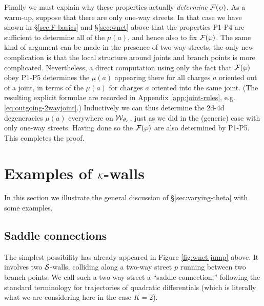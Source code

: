 \documentclass[11pt,a4paper]{article}
\def\CK {{\cal K}}
\def\CF {{\cal F}}
\def\wnet {{\cal W}}
\def\cS {{\cal S}}
\def\CK{{\cal K}}
\newcommand{\ti}[1]{\textit{#1}}
\def\CK {{\cal K}}
\def\CF {{\cal F}}
\def\wnet {{\cal W}}
\def\CK{{\cal K}}
\begin{document}
Finally we must explain why these properties actually \ti{determine} $\CF(\wp)$.
As a warm-up, suppose that there are only one-way streets.  In that case we have shown in \S \ref{sec:F-basics}
and \S \ref{sec:wnet} above that the properties P1-P4 are sufficient to determine all of the $\mu(a)$,
and hence also to fix $\CF(\wp)$.
The same kind of argument can be made in the presence of two-way streets; the only new complication is that
the local structure around joints and branch points is more complicated.
Nevertheless, a direct computation
using only the fact that $\CF(\wp)$ obey P1-P5 determines the $\mu(a)$ appearing there
for all charges $a$ oriented out of a joint, in terms of the $\mu(a)$ for charges $a$
oriented into the same joint.
(The resulting explicit formulae are recorded in Appendix
\ref{app:joint-rules}, e.g. \eqref{eq:outgoing-2wayjoint}.)
Inductively we can thus determine the 2d-4d
degeneracies $\mu(a)$ everywhere on $\wnet_{\vartheta_c}$, just as we did in the (generic) case
with only one-way streets.
Having done so the $\CF(\wp)$ are also determined by P1-P5.  This completes the proof.


\section{Examples of $\CK$-walls}

In this section we illustrate the general discussion of \S\ref{sec:varying-theta} with some examples.



\subsection{Saddle connections}\label{sec:saddle-connection}

The simplest possibility
has already appeared in Figure
\ref{fig:wnet-jump} above.  It involves two $\cS$-walls,
colliding along a two-way street $p$ running
between two branch points.  We call such a two-way street
a ``saddle connection,'' following the standard terminology for trajectories of quadratic differentials
(which is literally what we are considering here in the case $K=2$).
\end{document}
